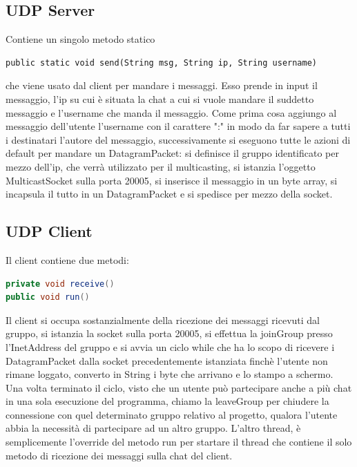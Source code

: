 \documentclass[]{article}
\begin{document}
\subsection{UDP Server}
Contiene un singolo metodo statico
\begin{lstlisting}
public static void send(String msg, String ip, String username)
\end{lstlisting}
che viene usato dal client per mandare i messaggi.
Esso prende in input il messaggio, l'ip su cui è situata la chat a cui si vuole mandare il suddetto messaggio e l'username che manda il messaggio.
Come prima cosa aggiungo al messaggio dell'utente l'username con il carattere ":" in modo da far sapere a tutti i destinatari l'autore del messaggio, successivamente si eseguono tutte le azioni di default per mandare un DatagramPacket: si definisce il gruppo identificato per mezzo dell'ip, che verrà utilizzato per il multicasting, si istanzia l'oggetto MulticastSocket sulla porta 20005, si inserisce il messaggio in un byte array, si incapsula il tutto in un DatagramPacket e si spedisce per mezzo della socket.
\subsection{UDP Client}
Il client contiene due metodi:
\begin{lstlisting}[language=java]
private void receive()
public void run()
\end{lstlisting}
Il client si occupa sostanzialmente della ricezione dei messaggi ricevuti dal gruppo, si istanzia la socket sulla porta 20005, si effettua la joinGroup presso l'InetAddress del gruppo e si avvia un ciclo while che ha lo scopo di ricevere i DatagramPacket dalla socket precedentemente istanziata finchè l'utente non rimane loggato, converto in String i byte che arrivano e lo stampo a schermo.
Una volta terminato il ciclo, visto che un utente può partecipare anche a più chat in una sola esecuzione del programma, chiamo la leaveGroup per chiudere la connessione con quel determinato gruppo relativo al progetto, qualora l'utente abbia la necessità di partecipare ad un altro gruppo.
L'altro thread, è semplicemente l'override del metodo run per startare il thread che contiene il solo metodo di ricezione dei messaggi sulla chat del client.
\end{document}
